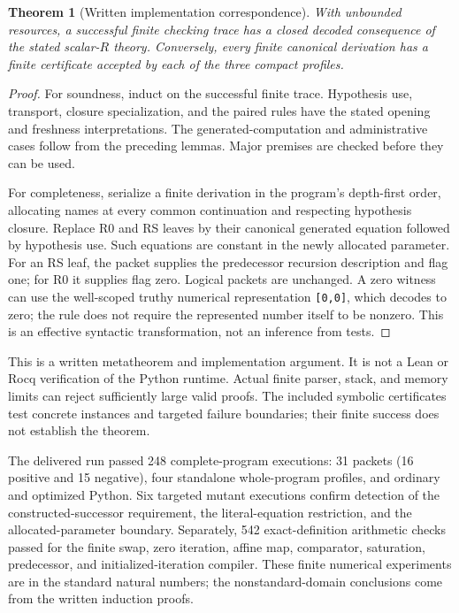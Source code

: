 \documentclass[11pt,letterpaper]{article}
\newtheorem{theorem}{Theorem}[section]
\theoremstyle{definition}\newtheorem{definition}[theorem]{Definition}
\theoremstyle{remark}\newtheorem{remark}[theorem]{Remark}
\begin{document}
\begin{theorem}[Written implementation correspondence]
With unbounded resources, a successful finite checking trace has a
closed decoded consequence of the stated scalar-$R$ theory. Conversely,
every finite canonical derivation has a finite certificate accepted by
each of the three compact profiles.
\end{theorem}
\begin{proof}
For soundness, induct on the successful finite trace. Hypothesis use,
transport, closure specialization, and the paired rules have the stated
opening and freshness interpretations. The generated-computation and
administrative cases follow from the preceding lemmas. Major premises
are checked before they can be used.

For completeness, serialize a finite derivation in the program's
depth-first order, allocating names at every common continuation and
respecting hypothesis closure. Replace R0 and RS leaves by their
canonical generated equation followed by hypothesis use. Such equations
are constant in the newly allocated parameter. For an RS leaf, the
packet supplies the predecessor recursion description and flag one;
for R0 it supplies flag zero. Logical packets are unchanged. A zero
witness can use the well-scoped truthy numerical representation
\texttt{[0,0]}, which decodes to zero; the rule does not require
the represented number itself to be nonzero. This is
an effective syntactic transformation, not an inference from tests.
\end{proof}

This is a written metatheorem and implementation argument. It is not a
Lean or Rocq verification of the Python runtime. Actual finite parser,
stack, and memory limits can reject sufficiently large valid proofs.
The included symbolic certificates test concrete instances and targeted
failure boundaries; their finite success does not establish the theorem.

The delivered run passed 248 complete-program executions: 31 packets
(16 positive and 15 negative), four standalone whole-program profiles,
and ordinary and optimized Python. Six targeted mutant executions
confirm detection of the constructed-successor requirement, the
literal-equation restriction, and the allocated-parameter boundary.
Separately, 542 exact-definition arithmetic checks passed for the finite
swap, zero iteration, affine map, comparator, saturation, predecessor,
and initialized-iteration compiler. These finite numerical experiments
are in the standard natural numbers; the nonstandard-domain conclusions
come from the written induction proofs.
\end{document}
